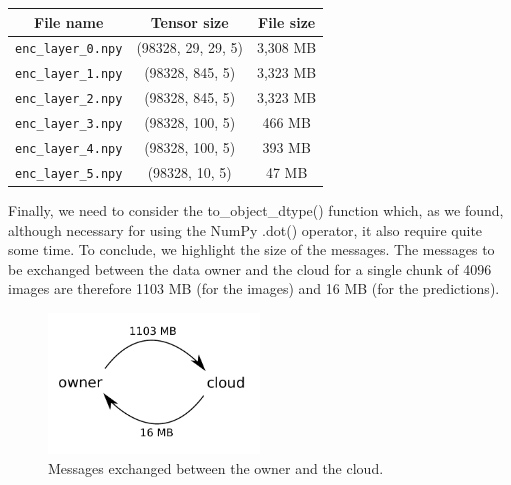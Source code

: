 \begin{center}
\begin{tabular}{ |c|c|c| } 
\hline
File name & Tensor size & File size \\
\hline
\hline
\texttt{enc_layer_0.npy} & (98328, 29, 29, 5) & 3,308 MB \\
\texttt{enc_layer_1.npy} & (98328, 845, 5) & 3,323 MB \\
\texttt{enc_layer_2.npy} & (98328, 845, 5) & 3,323 MB \\
\texttt{enc_layer_3.npy} & (98328, 100, 5) & 466 MB \\
\texttt{enc_layer_4.npy} & (98328, 100, 5) & 393 MB \\
\texttt{enc_layer_5.npy} & (98328, 10, 5) & 47 MB \\
\hline
\end{tabular}
\end{center}

Finally, we need to consider the to_object_dtype() function which, as we found, although necessary for using the NumPy .dot() operator, it also require quite some time. To conclude, we highlight the size of the messages. The messages to be exchanged between the data owner and the cloud for a single chunk of 4096 images are therefore 1103 MB (for the images) and 16 MB (for the predictions).

\begin{figure}[H]
	\centering
	\includegraphics[width=0.5\textwidth]{images/fig5.pdf}
    \caption{Messages exchanged between the owner and the cloud.}
    \label{fig:im4}
\end{figure}
